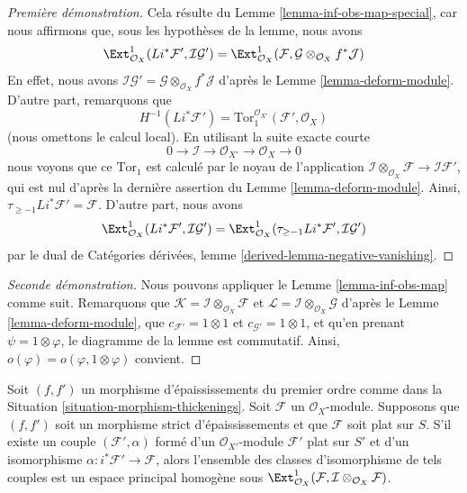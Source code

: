 \begin{proof}[Première démonstration]
Cela résulte du Lemme \ref{lemma-inf-obs-map-special},
car nous affirmons que, sous les hypothèses de la lemme, nous avons
$$
\Ext^1_{\mathcal{O}_X}(Li^*\mathcal{F}',
\mathcal{I}\mathcal{G}') =
\Ext^1_{\mathcal{O}_X}(\mathcal{F},
\mathcal{G} \otimes_{\mathcal{O}_X} f^*\mathcal{J})
$$
En effet, nous avons
$\mathcal{I}\mathcal{G}' =
\mathcal{G} \otimes_{\mathcal{O}_X} f^*\mathcal{J}$
d'après le Lemme \ref{lemma-deform-module}.
D'autre part, remarquons que
$$
H^{-1}(Li^*\mathcal{F}') =
\text{Tor}_1^{\mathcal{O}_{X'}}(\mathcal{F}', \mathcal{O}_X)
$$
(nous omettons le calcul local). En utilisant la suite exacte courte
$$
0 \to \mathcal{I} \to \mathcal{O}_{X'} \to \mathcal{O}_X \to 0
$$
nous voyons que ce $\text{Tor}_1$ est calculé par le noyau de l'application
$\mathcal{I} \otimes_{\mathcal{O}_X} \mathcal{F} \to \mathcal{I}\mathcal{F}'$,
qui est nul d'après la dernière assertion du Lemme \ref{lemma-deform-module}.
Ainsi, $\tau_{\geq -1}Li^*\mathcal{F}' = \mathcal{F}$.
D'autre part, nous avons
$$
\Ext^1_{\mathcal{O}_X}(Li^*\mathcal{F}',
\mathcal{I}\mathcal{G}') =
\Ext^1_{\mathcal{O}_X}(\tau_{\geq -1}Li^*\mathcal{F}',
\mathcal{I}\mathcal{G}')
$$
par le dual de
Catégories dérivées, lemme \ref{derived-lemma-negative-vanishing}.
\end{proof}

\begin{proof}[Seconde démonstration]
Nous pouvons appliquer le Lemme \ref{lemma-inf-obs-map} comme suit. Remarquons que
$\mathcal{K} = \mathcal{I} \otimes_{\mathcal{O}_X} \mathcal{F}$ et
$\mathcal{L} = \mathcal{I} \otimes_{\mathcal{O}_X} \mathcal{G}$
d'après le Lemme \ref{lemma-deform-module}, que
$c_{\mathcal{F}'} = 1 \otimes 1$ et $c_{\mathcal{G}'} = 1 \otimes 1$,
et qu'en prenant $\psi = 1 \otimes \varphi$, le diagramme de la lemme
est commutatif. Ainsi, $o(\varphi) = o(\varphi, 1 \otimes \varphi)$
convient.
\end{proof}

\begin{lemma}
\label{lemma-inf-ext-rel}
Soit $(f, f')$ un morphisme d'épaississements du premier ordre comme dans la
Situation \ref{situation-morphism-thickenings}.
Soit $\mathcal{F}$ un $\mathcal{O}_X$-module.
Supposons que $(f, f')$ soit un morphisme strict d'épaississements et que
$\mathcal{F}$ soit plat sur $S$. S'il existe un couple
$(\mathcal{F}', \alpha)$ formé d'un
$\mathcal{O}_{X'}$-module $\mathcal{F}'$ plat sur $S'$ et d'un isomorphisme
$\alpha : i^*\mathcal{F}' \to \mathcal{F}$, alors l'ensemble des
classes d'isomorphisme de tels couples est un espace principal homogène
sous
$\Ext^1_{\mathcal{O}_X}(
\mathcal{F}, \mathcal{I} \otimes_{\mathcal{O}_X} \mathcal{F})$.
\end{lemma}

